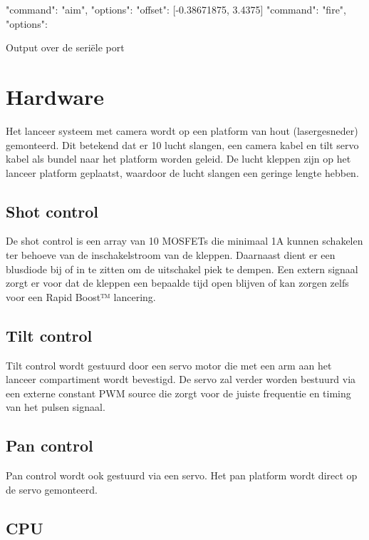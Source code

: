 \begin{listing}[H]
    \begin{jsoncode}
    {"command": "aim", "options": {"offset": [-0.38671875, 3.4375]}}
    {"command": "fire", "options": {}}
    \end{jsoncode}
    \caption{Output over de seriële port}
    \label{ls:output}
\end{listing}

\section{Hardware}

Het lanceer systeem met camera wordt op een platform van hout (lasergesneder)
gemonteerd. Dit betekend dat er 10 lucht slangen, een camera kabel en tilt servo
kabel als bundel naar het platform worden geleid. De lucht kleppen zijn op het
lanceer platform geplaatst, waardoor de lucht slangen een geringe lengte hebben.

\subsection{Shot control}

De shot control is een array van 10 MOSFETs die minimaal 1A kunnen schakelen
ter behoeve van de inschakelstroom van de kleppen. Daarnaast dient er een
blusdiode bij of in te zitten om de uitschakel piek te dempen. Een extern
signaal zorgt er voor dat de kleppen een bepaalde tijd open blijven of kan zorgen
zelfs voor een Rapid Boost™ lancering.

\subsection{Tilt control}

Tilt control wordt gestuurd door een servo motor die met een arm aan het lanceer
compartiment wordt bevestigd. De servo zal verder worden bestuurd via een
externe constant PWM source die zorgt voor de juiste frequentie en timing van
het pulsen signaal.

\subsection{Pan control}

Pan control wordt ook gestuurd via een servo. Het pan platform wordt direct op
de servo gemonteerd.

\subsection{CPU}

